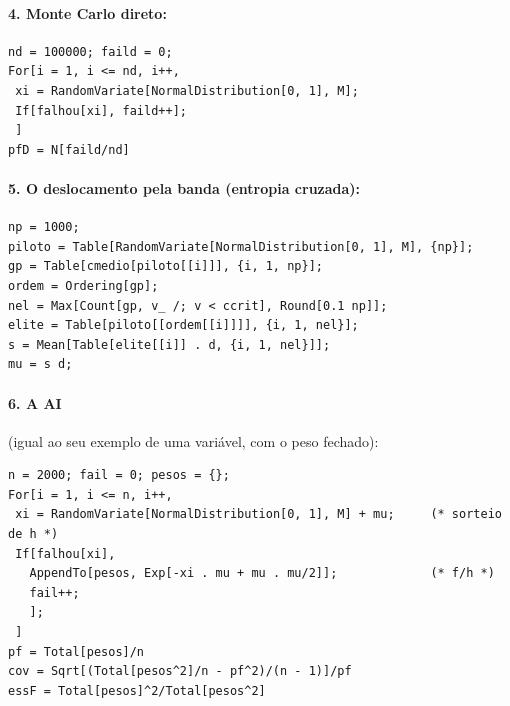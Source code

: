 \documentclass[11pt,a4paper]{article}
\begin{document}
\paragraph{4. Monte Carlo direto:}
\begin{lstlisting}
nd = 100000; faild = 0;
For[i = 1, i <= nd, i++,
 xi = RandomVariate[NormalDistribution[0, 1], M];
 If[falhou[xi], faild++];
 ]
pfD = N[faild/nd]
\end{lstlisting}

\paragraph{5. O deslocamento pela banda (entropia cruzada):}
\begin{lstlisting}
np = 1000;
piloto = Table[RandomVariate[NormalDistribution[0, 1], M], {np}];
gp = Table[cmedio[piloto[[i]]], {i, 1, np}];
ordem = Ordering[gp];
nel = Max[Count[gp, v_ /; v < ccrit], Round[0.1 np]];
elite = Table[piloto[[ordem[[i]]]], {i, 1, nel}];
s = Mean[Table[elite[[i]] . d, {i, 1, nel}]];
mu = s d;
\end{lstlisting}

\paragraph{6. A AI} (igual ao seu exemplo de uma variável, com o peso fechado):
\begin{lstlisting}
n = 2000; fail = 0; pesos = {};
For[i = 1, i <= n, i++,
 xi = RandomVariate[NormalDistribution[0, 1], M] + mu;     (* sorteio de h *)
 If[falhou[xi],
   AppendTo[pesos, Exp[-xi . mu + mu . mu/2]];             (* f/h *)
   fail++;
   ];
 ]
pf = Total[pesos]/n
cov = Sqrt[(Total[pesos^2]/n - pf^2)/(n - 1)]/pf
essF = Total[pesos]^2/Total[pesos^2]
\end{lstlisting}
\end{document}
